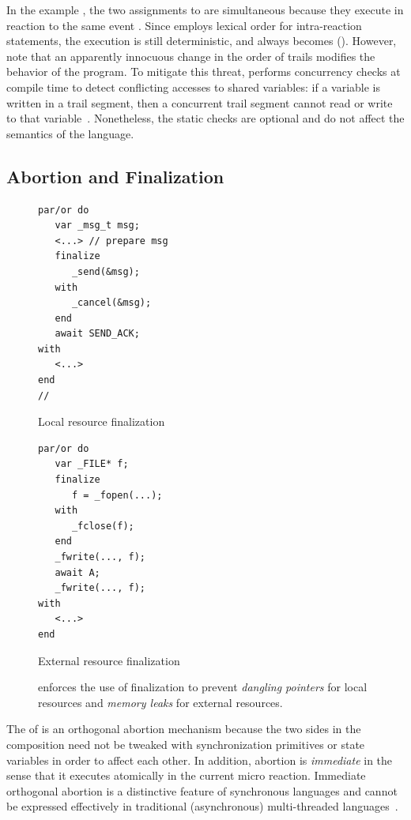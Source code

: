 In the example \bx, the two assignments to  are simultaneous because
they execute in reaction to the same event .
Since \CEU employs lexical order for intra-reaction statements, the execution
is still deterministic, and  always becomes  ().
%
However, note that an apparently innocuous change in the order of trails
modifies the behavior of the program.
%
To mitigate this threat, \CEU performs concurrency checks at compile time to
detect conflicting accesses to shared variables:
if a variable is written in a trail segment, then a concurrent trail segment
cannot read or write to that variable~\cite{ceu.sensys13}.
%
Nonetheless, the static checks are optional and do not affect the semantics of
the language.

\subsection{Abortion and Finalization}
\label{sec.ceu.fin}

\begin{figure}
\begin{minipage}[t]{0.45\linewidth}
\begin{lstlisting}[numbers=right]
par/or do
   var _msg_t msg;
   <...> // prepare msg
   finalize
      _send(&msg);
   with
      _cancel(&msg);
   end
   await SEND_ACK;
with
   <...>
end
//
\end{lstlisting}
\centering\small{\ax Local resource finalization}
\end{minipage}
%
\begin{minipage}[t]{0.53\linewidth}
\begin{lstlisting}[xleftmargin=2em]
par/or do
   var _FILE* f;
   finalize
      f = _fopen(...);
   with
      _fclose(f);
   end
   _fwrite(..., f);
   await A;
   _fwrite(..., f);
with
   <...>
end
\end{lstlisting}
\centering\small{\bx External resource finalization}
\end{minipage}
\caption{
\CEU enforces the use of finalization to prevent \emph{dangling pointers} for
local resources and \emph{memory leaks} for external resources.
\label{lst.fin.ceu}
}
\end{figure}

The  of \CEU is an orthogonal abortion mechanism because the two
sides in the composition need not be tweaked with synchronization primitives or
state variables in order to affect each other.
%
In addition, abortion is \emph{immediate} in the sense that it executes
atomically in the current micro reaction.
%
Immediate orthogonal abortion is a distinctive feature of synchronous languages
and cannot be expressed effectively in traditional (asynchronous)
multi-threaded languages~\cite{esterel.preemption,sync_async.threadsstop}.

